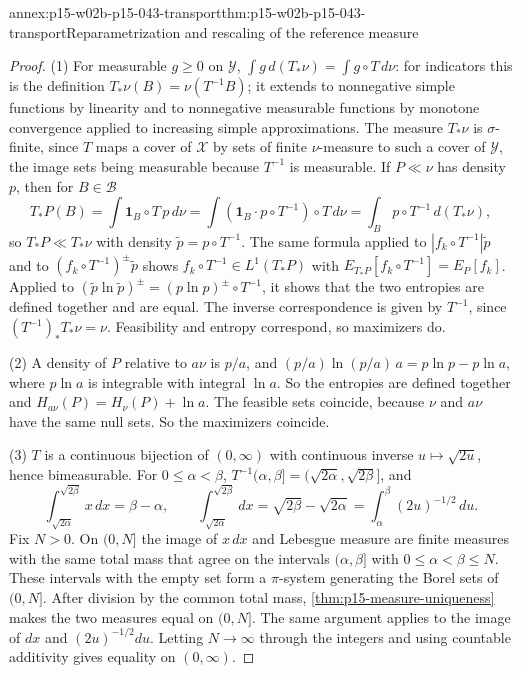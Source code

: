 \begin{annexitem}{annex:p15-w02b-p15-043-transport}{thm:p15-w02b-p15-043-transport}{Reparametrization and rescaling of the reference measure}
\begin{proof}
(1) For measurable \(g\geq0\) on \(\mathcal Y\),
\(\int g\,d(T_*\nu)=\int g\circ T\,d\nu\): for indicators this is the
definition \(T_*\nu(B)=\nu(T^{-1}B)\); it extends to nonnegative simple
functions by linearity and to nonnegative measurable functions by monotone
convergence applied to increasing simple approximations. The measure
\(T_*\nu\) is \(\sigma\)-finite, since \(T\) maps a cover of \(\mathcal X\) by
sets of finite \(\nu\)-measure to such a cover of \(\mathcal Y\), the image sets
being measurable because \(T^{-1}\) is measurable. If \(P\ll\nu\) has density
\(p\), then for \(B\in\mathcal B\)
\[
 T_*P(B)=\int\mathbf 1_B\circ T\,p\,d\nu
        =\int(\mathbf 1_B\cdot p\circ T^{-1})\circ T\,d\nu
        =\int_Bp\circ T^{-1}\,d(T_*\nu),
\]
so \(T_*P\ll T_*\nu\) with density \(\tilde p=p\circ T^{-1}\). The same formula
applied to \(|f_k\circ T^{-1}|\tilde p\) and to \((f_k\circ T^{-1})^\pm\tilde p\)
shows \(f_k\circ T^{-1}\in L^1(T_*P)\) with
\(E_{T_*P}[f_k\circ T^{-1}]=E_P[f_k]\). Applied to \((\tilde p\ln\tilde p)^\pm
=(p\ln p)^\pm\circ T^{-1}\), it shows that the two entropies are defined together
and are equal. The inverse correspondence is given by \(T^{-1}\), since
\((T^{-1})_*T_*\nu=\nu\). Feasibility and entropy correspond, so maximizers do.

(2) A density of \(P\) relative to \(a\nu\) is \(p/a\), and
\((p/a)\ln(p/a)\,a=p\ln p-p\ln a\), where \(p\ln a\) is integrable with integral
\(\ln a\). So the entropies are defined together and
\(H_{a\nu}(P)=H_\nu(P)+\ln a\). The feasible sets coincide, because \(\nu\) and
\(a\nu\) have the same null sets. So the maximizers coincide.

(3) \(T\) is a continuous bijection of \((0,\infty)\) with continuous inverse
\(u\mapsto\sqrt{2u}\), hence bimeasurable. For \(0\leq\alpha<\beta\),
\(T^{-1}(\alpha,\beta]=(\sqrt{2\alpha},\sqrt{2\beta}]\), and
\[
 \int_{\sqrt{2\alpha}}^{\sqrt{2\beta}}x\,dx=\beta-\alpha,\qquad
 \int_{\sqrt{2\alpha}}^{\sqrt{2\beta}}dx=\sqrt{2\beta}-\sqrt{2\alpha}
 =\int_\alpha^\beta(2u)^{-1/2}\,du .
\]
Fix \(N>0\). On \((0,N]\) the image of \(x\,dx\) and Lebesgue measure are finite
measures with the same total mass that agree on the intervals \((\alpha,\beta]\)
with \(0\leq\alpha<\beta\leq N\). These intervals with the empty set form a
\(\pi\)-system generating the Borel sets of \((0,N]\). After division by the
common total mass, \cref{thm:p15-measure-uniqueness} makes the two measures equal
on \((0,N]\). The same argument applies to the image of \(dx\) and
\((2u)^{-1/2}du\). Letting \(N\to\infty\) through the integers and using countable
additivity gives equality on \((0,\infty)\).
\end{proof}
\end{annexitem}

